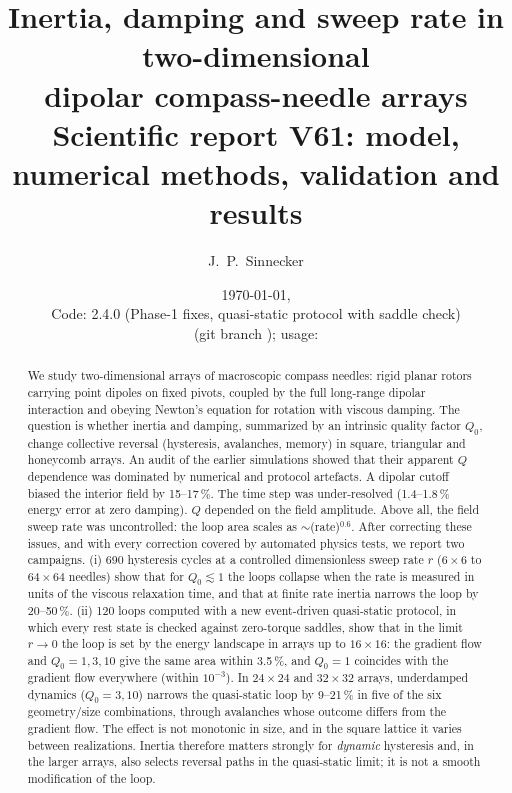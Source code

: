 \documentclass[11pt,a4paper]{article}
\title{\textbf{Inertia, damping and sweep rate in two-dimensional\\
dipolar compass-needle arrays}\\[1ex]
\large Scientific report V61: model, numerical methods, validation and results}
\author{J.~P.~Sinnecker}
\date{\today, \hhmm\\[0.5ex]
\small Code: \code{compass.py} 2.4.0 (Phase-1 fixes, quasi-static protocol with saddle check)\\
(git branch \code{fase2/dynamic-hysteresis}); usage: \code{USER\_GUIDE.md}}
\begin{document}
\maketitle

\begin{abstract}
\noindent
We study two-dimensional arrays of macroscopic compass needles: rigid planar rotors carrying point dipoles on fixed pivots, coupled by the full long-range dipolar interaction and obeying Newton's equation for rotation with viscous damping. The question is whether inertia and damping, summarized by an intrinsic quality factor $Q_0$, change collective reversal (hysteresis, avalanches, memory) in square, triangular and honeycomb arrays.
An audit of the earlier simulations showed that their apparent $Q$ dependence was dominated by numerical and protocol artefacts. A dipolar cutoff biased the interior field by 15--17\,\%. The time step was under-resolved (1.4--1.8\,\% energy error at zero damping). $Q$ depended on the field amplitude. Above all, the field sweep rate was uncontrolled: the loop area scales as $\sim$(rate)$^{0.6}$.
After correcting these issues, and with every correction covered by automated physics tests, we report two campaigns. (i) 690 hysteresis cycles at a controlled dimensionless sweep rate $r$ ($6\times6$ to $64\times64$ needles) show that for $Q_0\lesssim1$ the loops collapse when the rate is measured in units of the viscous relaxation time, and that at finite rate inertia narrows the loop by 20--50\,\%. (ii) 120 loops computed with a new event-driven quasi-static protocol, in which every rest state is checked against zero-torque saddles, show that in the limit $r\to0$ the loop is set by the energy landscape in arrays up to $16\times16$: the gradient flow and $Q_0=1,3,10$ give the same area within 3.5\,\%, and $Q_0=1$ coincides with the gradient flow everywhere (within $10^{-3}$). In $24\times24$ and $32\times32$ arrays, underdamped dynamics ($Q_0=3,10$) narrows the quasi-static loop by 9--21\,\% in five of the six geometry/size combinations, through avalanches whose outcome differs from the gradient flow. The effect is not monotonic in size, and in the square lattice it varies between realizations.
Inertia therefore matters strongly for \emph{dynamic} hysteresis and, in the larger arrays, also selects reversal paths in the quasi-static limit; it is not a smooth modification of the loop.
\end{abstract}

\tableofcontents
\newpage

\end{document}
